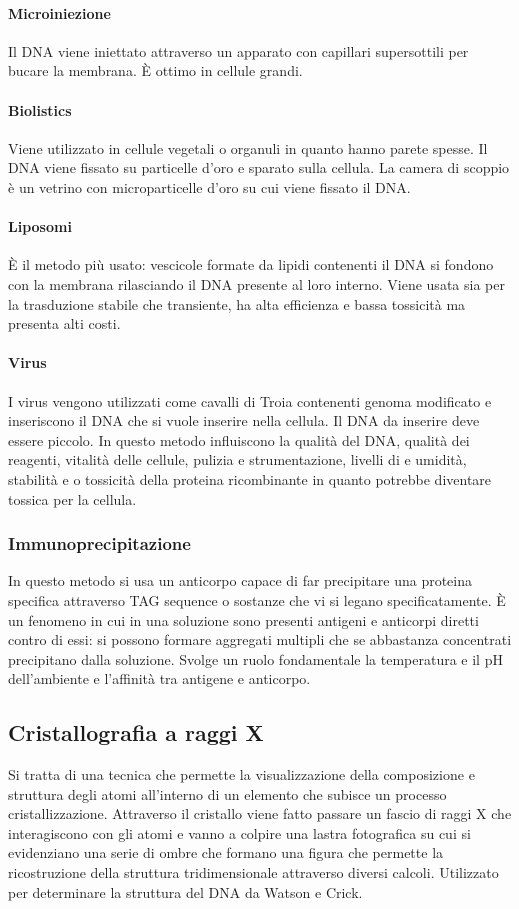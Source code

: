 \paragraph{Microiniezione}
Il DNA viene iniettato attraverso un apparato con capillari supersottili per bucare la membrana. \`E ottimo in cellule grandi.
\paragraph{Biolistics}
Viene utilizzato in cellule vegetali o organuli in quanto hanno parete spesse. Il DNA viene fissato su particelle d'oro e sparato sulla cellula. La camera di scoppio \`e un vetrino con
microparticelle d'oro su cui viene fissato il DNA. 
\paragraph{Liposomi}
\`E il metodo pi\`u usato: vescicole formate da lipidi contenenti il DNA si fondono con la membrana rilasciando il DNA presente al loro interno. Viene usata sia per la trasduzione 
stabile che transiente, ha alta efficienza e bassa tossicit\`a ma presenta alti costi.
\paragraph{Virus}
I virus vengono utilizzati come cavalli di Troia contenenti genoma modificato e inseriscono il DNA che si vuole inserire nella cellula. Il DNA da inserire deve essere piccolo. In questo
metodo influiscono la qualit\`a del DNA, qualit\`a dei reagenti, vitalit\`a delle cellule, pulizia e strumentazione, livelli di  e umidit\`a, stabilit\`a e o tossicit\`a della
proteina ricombinante in quanto potrebbe diventare tossica per la cellula. 
\subsubsection{Immunoprecipitazione}
In questo metodo si usa un anticorpo capace di far precipitare una proteina specifica attraverso TAG sequence o sostanze che vi si legano specificatamente. \`E un fenomeno in cui in
una soluzione sono presenti antigeni e anticorpi diretti contro di essi: si possono formare aggregati  multipli che se abbastanza concentrati precipitano dalla soluzione. Svolge un ruolo
fondamentale la temperatura e il pH dell'ambiente e l'affinit\`a tra antigene e anticorpo. 
\subsection{Cristallografia a raggi X}
Si tratta di una tecnica che permette la visualizzazione della composizione e struttura degli atomi all'interno di un elemento che subisce un processo cristallizzazione. Attraverso il 
cristallo viene fatto passare un fascio di raggi X che interagiscono con gli atomi e vanno a colpire una lastra fotografica su cui si evidenziano una serie di ombre che formano una
figura che permette la ricostruzione della struttura tridimensionale attraverso diversi calcoli. Utilizzato per determinare la struttura del DNA da Watson e Crick. 

